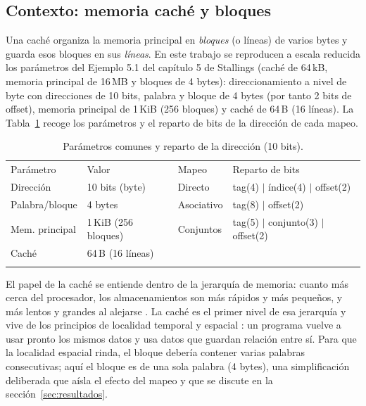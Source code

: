 \documentclass[llncs]{llncs}
\begin{document}
\subsection{Contexto: memoria caché y bloques}

Una caché organiza la memoria principal en \emph{bloques} (o
líneas) de varios bytes y guarda esos bloques en sus \emph{líneas}.
En este trabajo se reproducen a escala reducida los parámetros del
Ejemplo 5.1 del capítulo 5 de Stallings \cite{stallings2019} (caché de
64\,kB, memoria principal de 16\,MB y bloques de 4 bytes):
direccionamiento a nivel de byte
con direcciones de 10 bits, palabra y bloque de 4 bytes (por tanto 2
bits de offset), memoria principal de 1\,KiB (256 bloques) y caché de
64\,B (16 líneas). La Tabla~\ref{tab:par} recoge los parámetros y el
reparto de bits de la dirección de cada mapeo.

\begin{table}[t]
\centering
\caption{Parámetros comunes y reparto de la dirección (10 bits).}
\label{tab:par}
\small
\begin{tabular}{llll}
\hline\noalign{\smallskip}
Parámetro & Valor & Mapeo & Reparto de bits\\
\noalign{\smallskip}\hline\noalign{\smallskip}
Dirección & 10 bits (byte) & Directo & tag(4) $\vert$ índice(4) $\vert$ offset(2)\\
Palabra/bloque & 4 bytes & Asociativo & tag(8) $\vert$ offset(2)\\
Mem. principal & 1\,KiB (256 bloques) & Conjuntos & tag(5) $\vert$ conjunto(3) $\vert$ offset(2)\\
Caché & 64\,B (16 líneas) & & \\
\noalign{\smallskip}\hline
\end{tabular}
\end{table}

El papel de la caché se entiende dentro de la jerarquía de memoria:
cuanto más cerca del procesador, los almacenamientos son más rápidos y
más pequeños, y más lentos y grandes al alejarse
\cite{tanenbaum2013,wikipedia-locality}. La caché es el primer nivel
de esa jerarquía y vive de los principios de localidad temporal y
espacial \cite{wikipedia-locality,stallings2019}: un programa vuelve
a usar pronto los mismos datos y usa datos que guardan relación entre
sí. Para que la localidad espacial rinda, el bloque debería contener
varias palabras consecutivas; aquí el bloque es de una sola palabra
(4 bytes), una simplificación deliberada que aísla el efecto del
mapeo y que se discute en la sección~\ref{sec:resultados}.
\end{document}
